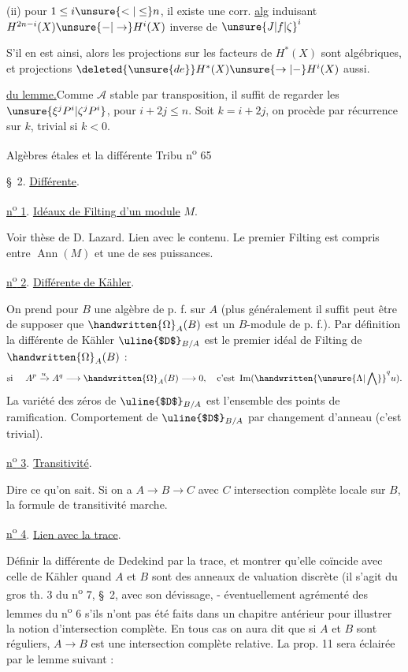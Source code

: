 (ii) pour  $1\leq i\unsure{<|\leq}n$, il existe une corr. \uline{alg}
induisant $H^{2n-i}(X)\unsure{-|\to}H^i(X)$ inverse de $\unsure{J|f|\zeta}^i$

 S'il en est ainsi, alors les \deleted{\unsure{$\xi$}} projections
sur les facteurs  de $H^{*}(X)$
sont algébriques, et  projections $\deleted{\unsure{de}}H^{*}(X)\unsure{\to|-}H^i(X)$
aussi.

\uline{ du lemme.}\quad Comme $\mathcal{A}$ stable par
transposition, il suffit de regarder les $\unsure{\xi^jP^i|\zeta^jP^i}$,
pour $i+2j\leq n$. Soit $k=i+2j$, on procède
par récurrence sur $k$, trivial si $k<0$.

Algèbres étales et la différente \hfill Tribu n\textsuperscript{o} 65

\S~2. \uline{Différente}.

\uline{n\textsuperscript{o} 1}. \uline{Idéaux de Filting d'un module} $M$.

Voir thèse de D. Lazard. Lien avec le contenu. Le premier Filting est compris entre
$\operatorname{Ann}(M)$ et une de ses puissances.

\uline{n\textsuperscript{o} 2}. \uline{Différente de Kähler}.

On prend pour $B$ une algèbre de p. f. sur $A$ (plus généralement il suffit peut
être de supposer que $\handwritten{\Omega}_{A}(B)$ est un $B$-module de p. f.). Par définition la différente
de Kähler $\text{\uline{$D$}}_{B/A}$ est le premier idéal de Filting de $\handwritten{\Omega}_{A}(B)$ :
\[
\text{si }\quad A^{p}\xrightarrow{u}A^{q}\longrightarrow\handwritten{\Omega}_{A}(B)\longrightarrow 0,\quad \text{c'est }\operatorname{Im}(\handwritten{\unsure{\Lambda|\bigwedge}}^{q}u).
\]
La variété des zéros de $\text{\uline{$D$}}_{B/A}$ est l'ensemble des points de ramification. Comportement
de $\text{\uline{$D$}}_{B/A}$ par changement d'anneau (c'est trivial).

\uline{n\textsuperscript{o} 3}. \uline{Transitivité}.

Dire ce qu'on sait. Si on a $A\to B\to C$ avec $C$ intersection complète locale
sur $B$, la formule de transitivité marche.

\uline{n\textsuperscript{o} 4}. \uline{Lien avec la trace}.

Définir la différente de Dedekind par la trace, et montrer qu'elle coïncide avec
celle de Kähler quand $A$ et $B$ sont des anneaux de valuation discrète (il s'agit
du gros th. 3 du n\textsuperscript{o} 7, \S~2, avec son dévissage, - éventuellement agrémenté des lemmes
du n\textsuperscript{o} 6 s'ils n'ont pas été faits dans un chapitre antérieur pour illustrer la notion
d'intersection complète. En tous cas on aura dit que si $A$ et $B$ sont réguliers,
$A\longrightarrow B$ est une intersection complète relative. La prop. 11 sera éclairée par le lemme
suivant :

